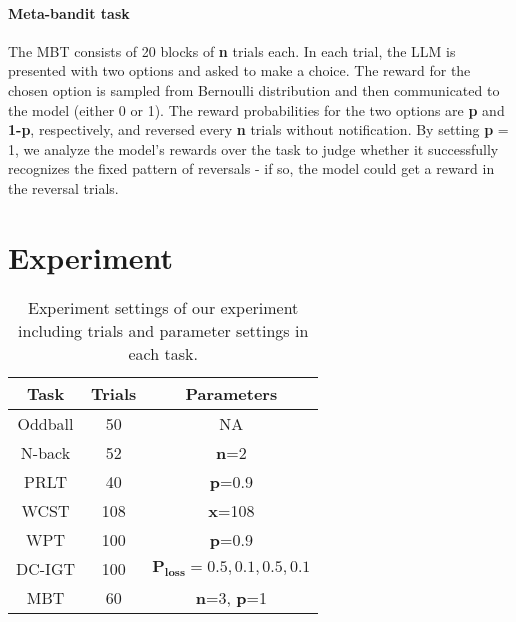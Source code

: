 \paragraph{Meta-bandit task} The MBT consists of 20 blocks of \textbf{n} trials each. In each trial, the LLM is presented with two options and asked to make a choice. The reward for the chosen option is sampled from Bernoulli distribution and then communicated to the model (either 0 or 1). The reward probabilities for the two options are \textbf{p} and \textbf{1-p}, respectively, and reversed every \textbf{n} trials without notification. By setting \textbf{p} = 1, we analyze the model's rewards over the task to judge whether it successfully recognizes the fixed pattern of reversals - if so, the model could get a reward in the reversal trials.

\section{Experiment}

\begin{table}
  \centering
  
\begin{tabular}{ccc}
    \hline
    \textbf{Task}& \textbf{Trials} &\textbf{Parameters}\\
    \hline
    Oddball& 50&NA\\
    N-back& 52&\textbf{n}=2\\
    PRLT& 40&\textbf{p}=0.9\\
    WCST& 108&\textbf{x}=108\\
    WPT& 100&\textbf{p}=0.9\\
    DC-IGT& 100&$\textbf{P}_\textbf{loss}={0.5, 0.1, 0.5, 0.1}$\\
    MBT& 60&\textbf{n}=3, \textbf{p}=1\\
    \hline
  \end{tabular}
  \caption{Experiment settings of our experiment including trials and parameter settings in each task.}
  \label{table1}
\end{table}

